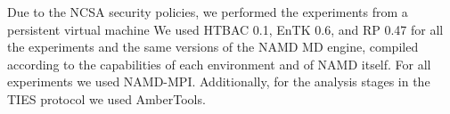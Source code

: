 








Due to the NCSA 
security policies, we performed the experiments from a persistent virtual 
machine 
We used HTBAC 0.1, EnTK 0.6, and RP 0.47 for all the experiments and
the same versions of the NAMD MD engine, compiled according to the
capabilities of each environment and of NAMD itself. For all experiments we used
NAMD-MPI. Additionally, for the analysis stages in the TIES protocol we used
AmberTools. 

